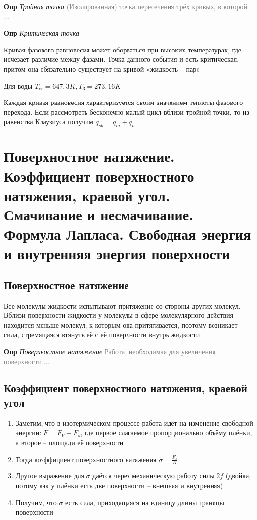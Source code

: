 \documentclass[a4paper, 14pt]{article}
\begin{document}
    \textbf{Опр} \textit{Тройная точка} \textcolor{gray}{(Изолированная) точка пересечения трёх кривых, в которой ...}
    
    \textbf{Опр} \textit{Критическая точка}
    
    Кривая фазового равновесия может оборваться при высоких температурах, где исчезает различие между фазами.
    Точка данного события и есть критическая, притом она обязательно существует на кривой «жидкость -- пар»
    
    Для воды $T_{cr} = 647,3 K, T_3 = 273,16 K$
    
    Каждая кривая равновесия характеризуется своим значением теплоты фазового перехода.
    Если рассмотреть бесконечно малый цикл вблизи тройной точки, то из равенства Клаузиуса получим $q_{sb} = q_m + q_{v}$
    
    \section{Поверхностное натяжение.
    Коэффициент поверхностного натяжения, краевой угол.
    Смачивание и несмачивание.
    Формула Лапласа.
    Свободная энергия и внутренняя энергия поверхности}
    
    \subsection{Поверхностное натяжение}
    
    Все молекулы жидкости испытывают притяжение со стороны других молекул.
    Вблизи поверхности жидкости у молекулы в сфере молекулярного действия находится меньше молекул, к которым она
    притягивается, поэтому возникает сила, стремящаяся втянуть её с её поверхности внутрь жидкости
    
    \textbf{Опр} \textit{Поверхностное натяжение} \textcolor{gray}{Работа, необходимая для увеличения поверхности ...}
    
    \subsection{Коэффициент поверхностного натяжения, краевой угол}
    
    \begin{enumerate}
        \item Заметим, что в изотермическом процессе работа идёт на изменение свободной энергии: $F = F_V + F_s$, где
        первое слагаемое пропорционально объёму плёнки, а второе -- площади её поверхности
        \item Тогда коэффициент поверхностного натяжения $\sigma = \frac{F_s}{\Pi}$
        \item Другое выражение для $\sigma$ даётся через механическую работу силы $2f$ (двойка, потому как у плёнки
        есть две поверхности -- внешняя и внутренняя)
        \item Получим, что $\sigma$ есть сила, приходящаяся на единицу длины границы поверхности
    \end{enumerate}
    
\end{document}
